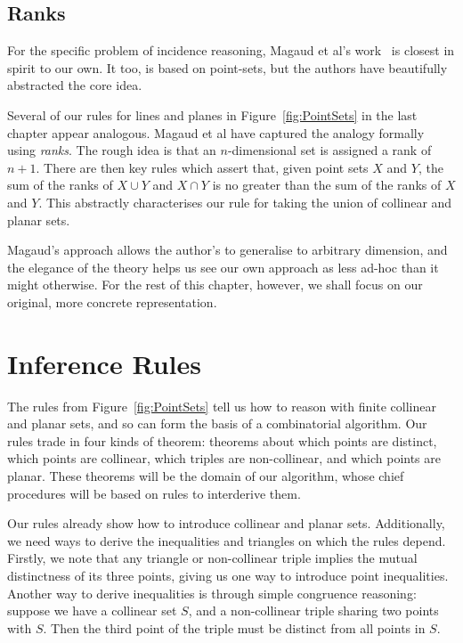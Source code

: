 \subsection{Ranks}
For the specific problem of incidence reasoning, Magaud et al's work~\cite{RankDesargues} is closest in spirit to our own. It too, is based on point-sets, but the authors have beautifully abstracted the core idea. 

Several of our rules for lines and planes in Figure~\ref{fig:PointSets} in the last chapter appear analogous. Magaud et al have captured the analogy formally using \emph{ranks}. The rough idea is that an $n$-dimensional set is assigned a rank of $n+1$. There are then key rules which assert that, given point sets $X$ and $Y$, the sum of the ranks of $X \cup Y$ and $X \cap Y$ is no greater than the sum of the ranks of $X$ and $Y$. This abstractly characterises our rule for taking the union of collinear and planar sets. 

Magaud's approach allows the author's to generalise to arbitrary dimension, and the elegance of the theory helps us see our own approach as less ad-hoc than it might otherwise. For the rest of this chapter, however, we shall focus on our original, more concrete representation.

\section{Inference Rules}
The rules from Figure~\ref{fig:PointSets} tell us how to reason with finite collinear and planar sets, and so can form the basis of a combinatorial algorithm. Our rules trade in four kinds of theorem: theorems about which points are distinct, which points are collinear, which triples are non-collinear, and which points are planar. These theorems will be the domain of our algorithm, whose chief procedures will be based on rules to interderive them.

Our rules already show how to introduce collinear and planar sets. Additionally, we need ways to derive the inequalities and triangles on which the rules depend. Firstly, we note that any triangle or non-collinear triple implies the mutual distinctness of its three points, giving us one way to introduce point inequalities. Another way to derive inequalities is through simple congruence reasoning: suppose we have a collinear set $S$, and a non-collinear triple sharing two points with $S$. Then the third point of the triple must be distinct from all points in $S$. 

